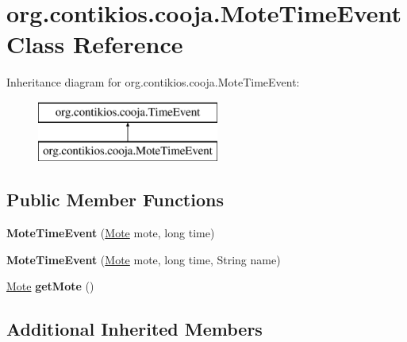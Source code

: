 \hypertarget{classorg_1_1contikios_1_1cooja_1_1MoteTimeEvent}{\section{org.\-contikios.\-cooja.\-Mote\-Time\-Event Class Reference}
\label{classorg_1_1contikios_1_1cooja_1_1MoteTimeEvent}
}
Inheritance diagram for org.\-contikios.\-cooja.\-Mote\-Time\-Event\-:\begin{figure}[H]
\begin{center}
\leavevmode
\includegraphics[height=2.000000cm]{classorg_1_1contikios_1_1cooja_1_1MoteTimeEvent}
\end{center}
\end{figure}
\subsection*{Public Member Functions}
\begin{DoxyCompactItemize}
\item 
\hypertarget{classorg_1_1contikios_1_1cooja_1_1MoteTimeEvent_a46be78ba957b24a731ef8b90839971dd}{{\bfseries Mote\-Time\-Event} (\hyperlink{interfaceorg_1_1contikios_1_1cooja_1_1Mote}{Mote} mote, long time)}\label{classorg_1_1contikios_1_1cooja_1_1MoteTimeEvent_a46be78ba957b24a731ef8b90839971dd}

\item 
\hypertarget{classorg_1_1contikios_1_1cooja_1_1MoteTimeEvent_af4a160f80571dcc7202fbbe9706e563e}{{\bfseries Mote\-Time\-Event} (\hyperlink{interfaceorg_1_1contikios_1_1cooja_1_1Mote}{Mote} mote, long time, String name)}\label{classorg_1_1contikios_1_1cooja_1_1MoteTimeEvent_af4a160f80571dcc7202fbbe9706e563e}

\item 
\hypertarget{classorg_1_1contikios_1_1cooja_1_1MoteTimeEvent_ad0b8edc53321833d1d430b5131c7d8c4}{\hyperlink{interfaceorg_1_1contikios_1_1cooja_1_1Mote}{Mote} {\bfseries get\-Mote} ()}\label{classorg_1_1contikios_1_1cooja_1_1MoteTimeEvent_ad0b8edc53321833d1d430b5131c7d8c4}

\end{DoxyCompactItemize}
\subsection*{Additional Inherited Members}


